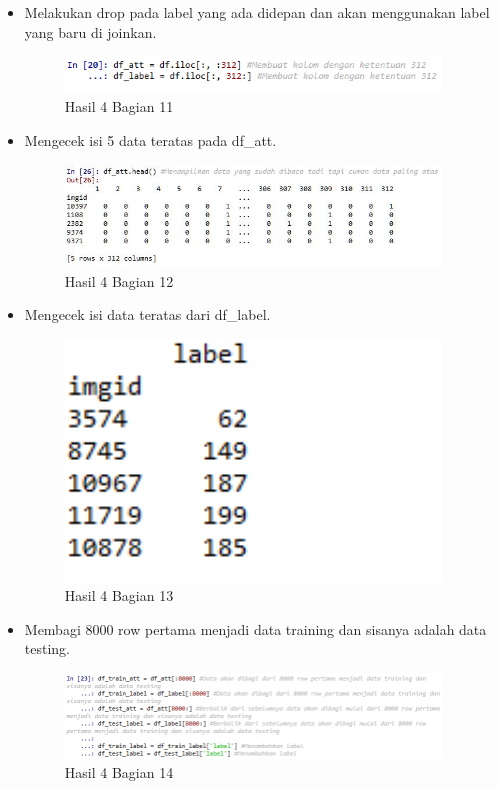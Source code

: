 \begin{itemize}
\item Melakukan drop pada label yang ada didepan dan akan menggunakan label yang baru di joinkan.

\begin{figure}[H]
\centerline{\includegraphics[width=10cm]{figures/1174077/3/18.png}}
\caption{Hasil 4 Bagian 11}
\label{labelgambar}
\end{figure}

\item Mengecek isi 5 data teratas pada df\_att.

\begin{figure}[H]
\centerline{\includegraphics[width=10cm]{figures/1174077/3/35.png}}
\caption{Hasil 4 Bagian 12}
\label{labelgambar}
\end{figure}

\item Mengecek isi data teratas dari df\_label.

\begin{figure}[H]
\centerline{\includegraphics[width=10cm]{figures/1174077/3/19.png}}
\caption{Hasil 4 Bagian 13}
\label{labelgambar}
\end{figure}

\item Membagi 8000 row pertama menjadi data training dan sisanya adalah data testing.

\begin{figure}[H]
\centerline{\includegraphics[width=10cm]{figures/1174077/3/20.png}}
\caption{Hasil 4 Bagian 14}
\label{labelgambar}
\end{figure}


\end{itemize}
